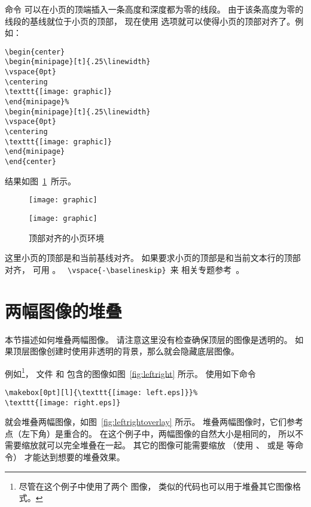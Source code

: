 命令  可以在小页的顶端插入一条高度和深度都为零的线段。
由于该条高度为零的线段的基线就位于小页的顶部，
现在使用 \opt{[t]} 选项就可以使得小页的顶部对齐了。例如：
\begin{lstlisting}
\begin{center}
\begin{minipage}[t]{.25\linewidth}
\vspace{0pt}
\centering
\texttt{[image: graphic]}
\end{minipage}%
\begin{minipage}[t]{.25\linewidth}
\vspace{0pt}
\centering
\texttt{[image: graphic]}
\end{minipage}
\end{center}
\end{lstlisting}
结果如图~\ref{fig:minipagesamp-3}~所示。
\begin{figure}
\begin{center}
	\begin{minipage}[t]{.25\linewidth}
		\vspace{0pt}
		\centering
		\texttt{[image: graphic]}
	\end{minipage}%
	\begin{minipage}[t]{.25\linewidth}
		\vspace{0pt}
		\centering
		\texttt{[image: graphic]}
	\end{minipage}
\end{center}
\caption{顶部对齐的小页环境}\label{fig:minipagesamp-3}
\end{figure}

这里小页的顶部是和当前基线对齐。
如果要求小页的顶部是和当前文本行的顶部对齐，
可用 。
  ~\verb+\vspace{-\baselineskip}+~来
相关专题参考~\cite[第~863--865~页]{Mittelbach2004}。


\section{两幅图像的堆叠}
本节描述如何堆叠两幅图像。
请注意这里没有检查确保顶层的图像是透明的。
如果顶层图像创建时使用非透明的背景，那么就会隐藏底层图像。

例如\footnote{
	尽管在这个例子中使用了两个  图像，
	类似的代码也可以用于堆叠其它图像格式。
}，
文件  和  包含的图像如图~\ref{fig:leftright} 所示。
使用如下命令
\begin{lstlisting}
\makebox[0pt][l]{\texttt{[image: left.eps]}}%
\texttt{[image: right.eps]}
\end{lstlisting}
就会堆叠两幅图像，如图~\ref{fig:leftrightoverlay} 所示。
堆叠两幅图像时，它们参考点（左下角）是重合的。
在这个例子中，两幅图像的自然大小是相同的，
所以不需要缩放就可以完全堆叠在一起。
其它的图像可能需要缩放
（使用 、 或是  等命令）
才能达到想要的堆叠效果。

